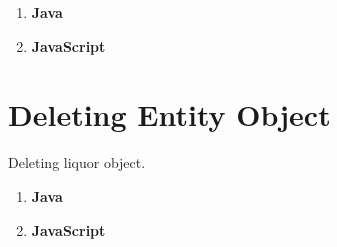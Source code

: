 	\begin{enumerate}

		\item \small \textbf{Java} 
			

	
		\item \small \textbf{JavaScript}
			


	\end{enumerate}




\section{Deleting Entity Object}
Deleting liquor object.

	\begin{enumerate}

		\item \small \textbf{Java}
			


		\item \small \textbf{JavaScript}
			

	\end{enumerate}





